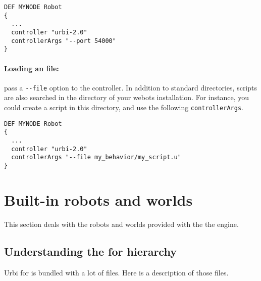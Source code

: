 \begin{lstlisting}
DEF MYNODE Robot
{
  ...
  controller "urbi-2.0"
  controllerArgs "--port 54000"
}
\end{lstlisting}

\paragraph{Loading an \us file:} pass a \verb+--file+ option to the
controller. In addition to standard directories, scripts are also
searched in the  directory of
your webots installation. For instance, you could create a
 script in this directory, and use the
following \verb+controllerArgs+.

\begin{lstlisting}
DEF MYNODE Robot
{
  ...
  controller "urbi-2.0"
  controllerArgs "--file my_behavior/my_script.u"
}
\end{lstlisting}

\section{Built-{}in robots and worlds}

This section deals with the robots and worlds provided with the the
engine.


\subsection{Understanding the \urbi for \webots hierarchy}

 Urbi for \webots is bundled with a lot of files. Here is a description of
those files.

